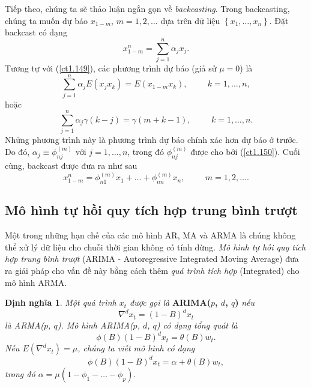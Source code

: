 \documentclass[12pt, a4paper,oneside]{book}
\theoremstyle{definition}
\newtheorem{dn}[theo]{Định nghĩa}
\begin{document}
Tiếp theo, chúng ta sẽ thảo luận ngắn gọn về \textit{backcasting}. Trong backcasting, chúng ta muốn dự báo $ x_{1-m} $, $ m=1, 2, \dots$ dựa trên dữ liệu $ \left\lbrace x_{1}, \dots, x_{n} \right\rbrace$. Đặt backcast có dạng
\begin{equation}
x_{1-m}^n=\sum_{j=1}^{n}\alpha_{j}x_{j}. \label{ct1.172}
\end{equation}
Tương tự với (\ref{ct1.149}), các phương trình dự báo (giả sử $ \mu = 0 $) là 
\begin{equation}
\sum_{j=1}^{n}\alpha_{j}E(x_{j}x_{k})=E(x_{1-m}x_{k}), \hspace{1cm} k=1, \dots, n, \label{ct1.173}
\end{equation}
hoặc 
\begin{equation}
\sum_{j=1}^{n}\alpha_{j}\gamma(k-j)=\gamma(m+k-1), \hspace{1cm} k=1, \dots, n. \label{ct1.174}
\end{equation}
Những phương trình này là phương trình dự báo chính xác hơn dự báo ở trước. Do đó, $ \alpha_{j}\equiv \phi_{nj}^{(m)} $ với $ j=1, \dots, n$, trong đó $ \phi_{nj}^{(m)} $ được cho bởi (\ref{ct1.150}). Cuối cùng, backcast được đưa ra như sau
\begin{equation}
x_{1-m}^n= \phi_{n1}^{(m)}x_{1}+ \dots+ \phi_{nn}^{(m)}x_{n}, \hspace{1cm} m=1, 2, \dots. \label{ct1.175}
\end{equation}

\subsection{\label{arima}Mô hình tự hồi quy tích hợp trung bình trượt}
Một trong những hạn chế của các mô hình AR, MA và ARMA là chúng không thể xử lý dữ liệu cho chuỗi thời gian không có tính dừng. \textit{Mô hình tự hồi quy tích hợp trung bình trượt} (ARIMA - Autoregressive Integrated Moving Average) đưa ra giải pháp cho vấn đề này bằng cách thêm \textit{quá trình tích hợp} (Integrated) cho mô hình ARMA.
\begin{dn}\cite{8, 9, 10}
	\textit{Một quá trình $ x_{t} $ được gọi là} \textbf{ARIMA($p$, $d$, $q$)} \textit{nếu 
		$$\nabla^{d} x_{t}=(1-B)^{d}x_{t}$$
		là ARMA($p$, $q$). Mô hình ARIMA($p$, $d$, $q$) có dạng tổng quát là
		\begin{equation}
		\phi(B)(1-B)^{d}x_{t}=\theta(B)w_{t}. \label{ct1.185}
		\end{equation} 
		Nếu $E(\nabla^{d} x_{t})=\mu$, chúng ta viết mô hình có dạng
		$$\phi(B)(1-B)^{d}x_{t}=\alpha+\theta(B)w_{t},$$
		trong đó $ \alpha=\mu(1-\phi_{1}-\dots-\phi_{p}).$}
\end{dn}
\end{document}
